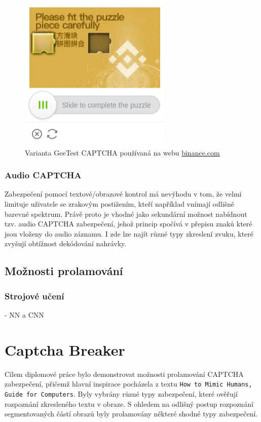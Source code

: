\documentclass[
  master=true,
  biblatex,
  glossaries,
  index
]{kidiplom}
\begin{document}
\begin{figure}
  \centering
  \includegraphics{images/geetest.png}
  \caption{Varianta GeeTest CAPTCHA používaná na webu \url{binance.com}}
  \label{fig:captcha_geetest}
\end{figure}


\subsubsection*{Audio CAPTCHA}
Zabezpečení pomocí textové/obrazové kontrol má nevýhodu v tom, že velmi limituje uživatele se zrakovým postižením, kteří například vnímají odlišně barevné spektrum. Právě proto je vhodné jako sekundární možnost nabídnout tzv. audio CAPTCHA zabezpečení, jehož princip spočívá v přepisu znaků které jsou vloženy do audio záznamu. I zde lze najít různé typy zkreslení zvuku, které zvyšují obtížnost dekódování nahrávky. 

\subsection{Možnosti prolamování}
 \subsubsection{Strojové učení}
 - NN a CNN
\newpage
\section{Captcha Breaker}
Cílem diplomové práce bylo demonstrovat možnosti prolamování CAPTCHA zabezpečení, přičemž hlavní inspirace pocházela z textu \texttt{How to Mimic Humans, Guide for Computers}. Byly vybrány různé typy zabezpečení, které ověřují rozpoznání zkresleného textu v obraze. S ohledem na odlišný postup rozpoznání segmentovaných částí obrazů byly prolamovány některé shodné typy zabezpečení. 
\end{document}

